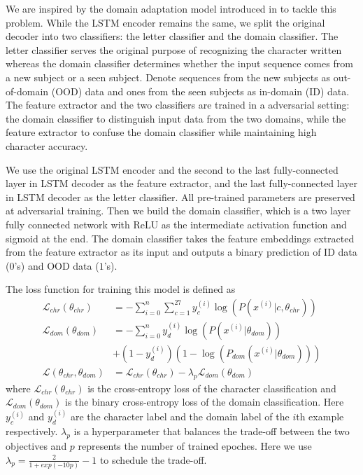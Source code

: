 \documentclass{article}
\begin{document}
\begin{multicols*}{2}
We are inspired by the domain adaptation model introduced in \cite{dann} to tackle this problem. While the LSTM encoder remains the same, we split the original decoder into two classifiers: the letter classifier and the domain classifier. The letter classifier serves the original purpose of recognizing the character written whereas the domain classifier determines whether the input sequence comes from a new subject or a seen subject. Denote sequences from the new subjects as out-of-domain (OOD) data and ones from the seen subjects as in-domain (ID) data. The feature extractor and the two classifiers are trained in a adversarial setting: the domain classifier to distinguish input data from the two domains, while the feature extractor to confuse the domain classifier while maintaining high character accuracy.

We use the original LSTM encoder and the second to the last fully-connected layer in LSTM decoder as the feature extractor, and the last fully-connected layer in LSTM decoder as the letter classifier. All pre-trained parameters are preserved at adversarial training. Then we build the domain classifier, which is a two layer fully connected network with ReLU as the intermediate activation function and sigmoid at the end. The domain classifier takes the feature embeddings extracted from the feature extractor as its input and outputs a binary prediction of ID data ($0$'s) and OOD data ($1$'s).

The loss function for training this model is defined as
\begin{align*}
    \mathcal{L}_{chr}(\theta_{chr}) &= -\sum_{i = 0}^n\sum_{c = 1}^{27}y_{c}^{(i)}\log(P(x^{(i)}|c, \theta_{chr}))\\
    \mathcal{L}_{dom}(\theta_{dom}) &= -\sum_{i = 0}^n y_{d}^{(i)}\log(P(x^{(i)}|\theta_{dom})) \\&+ (1 - y_{d}^{(i)})(1 - \log(P_{dom}(x^{(i)}|\theta_{dom})))\\
    \mathcal{L}(\theta_{chr}, \theta_{dom}) &= \mathcal{L}_{chr}(\theta_{chr}) - \lambda_p\mathcal{L}_{dom}(\theta_{dom})
\end{align*}
where $\mathcal{L}_{chr}(\theta_{chr})$ is the cross-entropy loss of the character classification and $\mathcal{L}_{dom}(\theta_{dom})$ is the binary cross-entropy loss of the domain classification. Here $y_{c}^{(i)}$ and $y_{d}^{(i)}$ are the character label and the domain label of the $i$th example respectively. $\lambda_p$ is a hyperparameter that balances the trade-off between the two objectives and $p$ represents the number of trained epoches. Here we use $\lambda_p = \frac{2}{1+exp(-10p)}-1$ to schedule the trade-off.


\end{multicols*}
\end{document}
